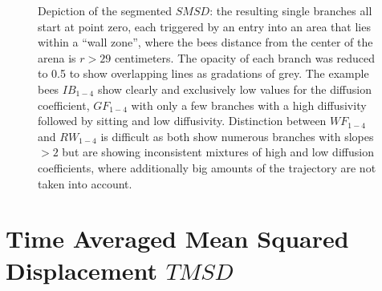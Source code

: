\newpage
\begin{figure}[H]
    \centering
    \caption{Depiction of the segmented $SMSD$: the resulting single branches all start at point zero, each triggered by an entry into an area that lies within a ``wall zone'', where the bees distance from the center of the arena is $r > 29$ centimeters. The opacity of each branch was reduced to 0.5 to show overlapping lines as gradations of grey. The example bees $IB_{1-4}$ show clearly and exclusively low values for the diffusion coefficient, $GF_{1-4}$ with only a few branches with a high diffusivity followed by sitting and low diffusivity. Distinction between $WF_{1-4}$ and $RW_{1-4}$ is difficult as both show numerous branches with slopes $>2$ but are showing inconsistent mixtures of high and low diffusion coefficients, where additionally big amounts of the trajectory are not taken into account.}
    \label{fig:MSD_branches_BW}
\end{figure}



\newpage
\section{Time Averaged Mean Squared Displacement $TMSD$}
\label{sec:TMSD}

